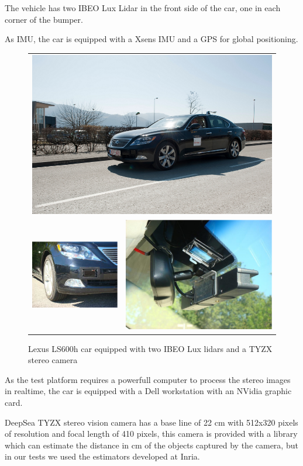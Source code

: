 The vehicle has two IBEO Lux Lidar in the front side of the car, one in each corner of the bumper.

As IMU, the car is equipped with a Xsens IMU and a GPS for global positioning.

\begin{figure}[h]
   \centering
     \begin{tabular}{lr}
     \multicolumn{2}{c}{ \includegraphics[width=0.55\columnwidth]{img/testbed:car}}\\
       \includegraphics[width=0.40\columnwidth]{img/testbed:ibeo}
       &\includegraphics[width=0.40\columnwidth]{img/testbed:tyzx}
     \end{tabular}
   \caption{Lexus LS600h car equipped with two IBEO Lux lidars and a TYZX
     stereo camera}
   \label{fig:Lexus}
 \end{figure}

As the test platform requires a powerfull computer to process the stereo images in realtime, the car is equipped with a Dell workstation with an NVidia graphic card.

DeepSea TYZX stereo vision camera has a base line of 22 cm with 512x320 pixels of resolution and focal length of 410 pixels, this camera is provided with a library which can estimate the distance in cm of the objects captured by the camera, but in our tests we used the estimators developed at Inria\cite{PERROLLAZ-2010-493397}.


